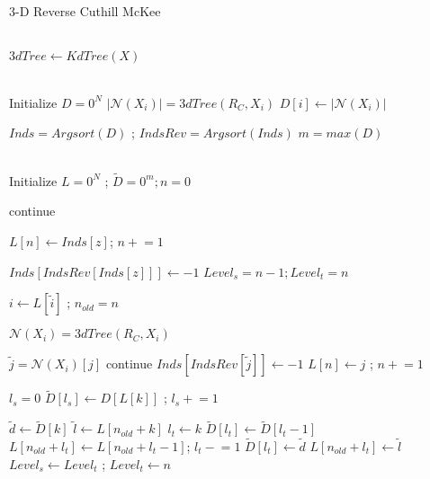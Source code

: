 \documentclass[a4paper]{article}
\begin{document}
\begin{algorithm}
\caption{3-D Reverse Cuthill McKee}\label{alg:3DRCM}
\begin{algorithmic}[1]
\\
\State $3dTree \gets KdTree(X)$ 


\\
\State Initialize $D = 0^{N}$
    \State $|\mathcal{N}(X_i)| = 3dTree(R_C, X_i)$
    \State $D[i] \gets |\mathcal{N}(X_i)|$
\EndFor
  
\State $Inds = Argsort(D)$ ; $IndsRev = Argsort(Inds)$ 
\State $m = max(D)$


\\
\State Initialize $L = 0^{N}$ ; $\tilde{D} = 0^{m}; n = 0$

    \State continue
    \EndIf

    \State $L[n] \gets Inds[z]$; $n \mathrel{+}= 1$ 

    \State $Inds[IndsRev[Inds[z]]] \gets -1$ 
    \State $Level_{s} = n - 1 ; Level_{t} = n$ 
    
            \State $i \gets L[\tilde{i}]$ ; $n_{old} = n$
 
            \State $\mathcal{N}(X_i) = 3dTree(R_C, X_i)$ 

                \State $\tilde{j} = \mathcal{N}(X_i)[j]$
                    \State continue
                \EndIf
                \State $Inds[IndsRev[\tilde{j}]] \gets -1 $ 
                \State $L[n] \gets j$ ; $n \mathrel{+}= 1$
            
            \EndFor
            
            \State $l_s = 0$
                \State $\tilde{D}[l_s] \gets D[L[k]]$ ; $l_s \mathrel{+}= 1$
            \EndFor

                \State $\tilde{d} \gets \tilde{D}[k]$
                \State $\tilde{l} \gets L[n_{old} + k]$
                \State $l_t \gets k$
                    \State $\tilde{D}[l_t] \gets \tilde{D}[l_t - 1]$
                    \State $L[n_{old} +l_t] \gets L[n_{old} + l_t -1]$; $l_t \mathrel{-}= 1$
                \EndWhile
                \State $\tilde{D}[l_t] \gets \tilde{d}$
                \State $L[n_{old} + l_t] \gets \tilde{l} $
            \EndFor
        \EndFor
    \State $Level_s \gets Level_t$ ; $Level_t \gets n$
        

\end{algorithmic}
\end{algorithm}
\end{document}
